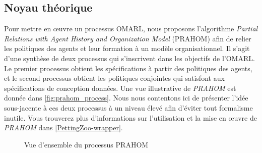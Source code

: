 \subsection{Noyau théorique}

Pour mettre en œuvre un processus OMARL, nous proposons l'algorithme \emph{Partial Relations with Agent History and Organization Model} (PRAHOM) afin de relier les politiques des agents et leur formation à un modèle organisationnel.
Il s'agit d'une synthèse de deux processus qui s'inscrivent dans les objectifs de l'OMARL. Le premier processus obtient les spécifications à partir des politiques des agents, et le second processus obtient les politiques conjointes qui satisfont aux spécifications de conception données. Une vue illustrative de \emph{PRAHOM} est donnée dans \autoref{fig:prahom_process}.
Nous nous contentons ici de présenter l'idée sous-jacente à ces deux processus à un niveau élevé afin d'éviter tout formalisme inutile. Vous trouverez plus d'informations sur l'utilisation et la mise en œuvre de \emph{PRAHOM} dans \autoref{PettingZoo-wrapper}.

\begin{figure}[h!]
    \centering
    
    \caption{Vue d'ensemble du processus PRAHOM}
    \label{fig:prahom_process}
\end{figure}





